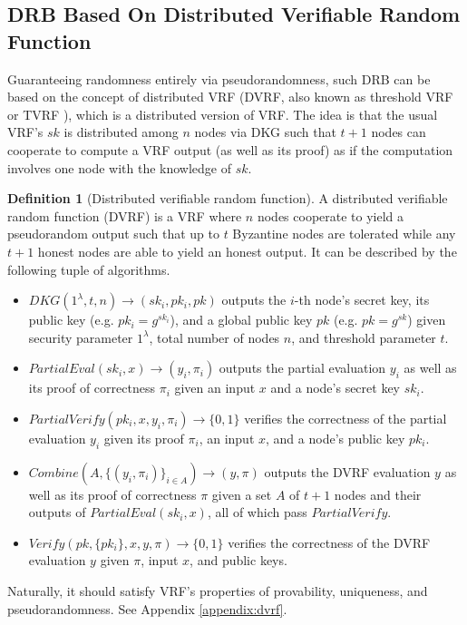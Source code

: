 \documentclass[letterpaper,twocolumn,10pt]{article}
\theoremstyle{definition}
\newtheorem{definition}[theorem]{Definition}
\theoremstyle{remark}
\begin{document}
\subsection{DRB Based On Distributed Verifiable Random Function}
Guaranteeing randomness entirely via pseudorandomness, such DRB can be based on the concept of distributed VRF \cite{hanke2018dfinity,galindo2020fully} (DVRF, also known as threshold VRF or TVRF \cite{cascudomt}), which is a distributed version of VRF. The idea is that the usual VRF's $sk$ is distributed among $n$ nodes via DKG such that $t + 1$ nodes can cooperate to compute a VRF output (as well as its proof) as if the computation involves one node with the knowledge of $sk$.

\begin{definition}[Distributed verifiable random function]
A distributed verifiable random function (DVRF) is a VRF where $n$ nodes cooperate to yield a pseudorandom output such that up to $t$ Byzantine nodes are tolerated while any $t + 1$ honest nodes are able to yield an honest output. It can be described by the following tuple of algorithms.
\begin{itemize}
\item $DKG(1^\lambda, t, n) \rightarrow (sk_i, pk_i, pk)$ outputs the $i$-th node's secret key, its public key (e.g. $pk_i = g^{sk_i}$), and a global public key $pk$ (e.g. $pk = g^{sk}$) given security parameter $1^\lambda$, total number of nodes $n$, and threshold parameter $t$.
\item $PartialEval(sk_i, x) \rightarrow (y_i, \pi_i)$ outputs the partial evaluation $y_i$ as well as its proof of correctness $\pi_i$ given an input $x$ and a node's secret key $sk_i$.
\item $PartialVerify(pk_i, x, y_i, \pi_i) \rightarrow \{0, 1\}$ verifies the correctness of the partial evaluation $y_i$ given its proof $\pi_i$, an input $x$, and a node's public key $pk_i$.
\item $Combine(A, \{(y_i, \pi_i)\}_{i \in A}) \rightarrow (y, \pi)$ outputs the DVRF evaluation $y$ as well as its proof of correctness $\pi$ given a set $A$ of $t + 1$ nodes and their outputs of $PartialEval(sk_i, x)$, all of which pass $PartialVerify$.
\item $Verify(pk, \{pk_i\}, x, y, \pi) \rightarrow \{0, 1\}$ verifies the correctness of the DVRF evaluation $y$ given $\pi$, input $x$, and public keys.
\end{itemize}
Naturally, it should satisfy VRF's properties of provability, uniqueness, and pseudorandomness. See Appendix \ref{appendix:dvrf}.
\end{definition}
\end{document}
